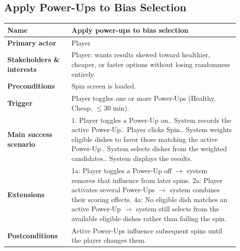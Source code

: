 \documentclass[sigconf]{acmart}
\begin{document}
\subsection*{Apply Power-Ups to Bias Selection}
{\footnotesize
\begin{supertabular}{@{}p{0.26\linewidth}p{0.68\linewidth}@{}}
\textbf{Name} & Apply power-ups to bias selection \\
\hline
\textbf{Primary actor} & Player \\
\hline
\textbf{Stakeholders \& interests} & Player: wants results skewed toward healthier, cheaper, or faster options without losing randomness entirely. \\
\hline
\textbf{Preconditions} & Spin screen is loaded. \\
\hline
\textbf{Trigger} & Player toggles one or more Power-Ups (Healthy, Cheap, $\leq$30 min). \\
\hline
\textbf{Main success scenario} & 1. Player toggles a Power-Up on.. System records the active Power-Up.. Player clicks Spin.. System weights eligible dishes to favor those matching the active Power-Up.. System selects dishes from the weighted candidates.. System displays the results. \\
\hline
\textbf{Extensions} & 1a: Player toggles a Power-Up off $\rightarrow$ system removes that influence from later spins.\newline
2a: Player activates several Power-Ups $\rightarrow$ system combines their scoring effects.\newline
4a: No eligible dish matches an active Power-Up $\rightarrow$ system still selects from the available eligible dishes rather than failing the spin. \\
\hline
\textbf{Postconditions} & Active Power-Ups influence subsequent spins until the player changes them. \\
\end{supertabular}
}
\end{document}
